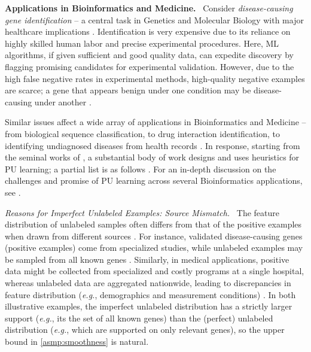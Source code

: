 \documentclass[11pt]{article}
\theoremstyle{plain}
\theoremstyle{definition}
\theoremstyle{remark}
\renewcommand{\paragraph}[1]{\medskip \noindent\textbf{#1}~}
\newcommand{\itparagraph}[1]{\medskip \noindent\textit{#1}~}
\newcommand{\eg}{\textit{e.g.}}
\begin{document}
    \paragraph{Applications in Bioinformatics and Medicine.} %
    Consider \textit{disease-causing gene identification} -- a central task in Genetics and Molecular Biology with major healthcare implications \cite{mordelet2011prodige,yang2012positive}.
    Identification is very expensive due to its reliance on highly skilled human labor and precise experimental procedures. 
    Here, ML algorithms, if given sufficient and good quality data, can expedite discovery by flagging promising candidates for experimental validation.
    However, due to the high false negative rates in experimental methods, high-quality negative examples are scarce; a gene that appears benign under one condition may be disease-causing under another \cite{reviewPUBioformatics2021}.

    Similar issues affect a wide array of applications in Bioinformatics and Medicine -- from biological sequence classification, to drug interaction identification, to identifying undiagnosed diseases from health records \cite{elkan2008pu}.
    In response, starting from the seminal works of \cite{hur2006proteinProtein,elkan2008pu}, a substantial body of work designs and uses heuristics for PU learning; a partial list is as follows \cite{ming2016pupylation,pengyi2019adaSampling,zhao2008geneFunction,xiao2008niologicalSequence,yang2012positive,luigi2010geneRegulatory}.
    For an in-depth discussion on the challenges and promise of PU learning across several Bioinformatics applications, see \citet{reviewPUBioformatics2021}.
    


    \itparagraph{Reasons for Imperfect Unlabeled Examples: Source Mismatch.}
        The feature distribution of unlabeled samples often differs from that of the positive examples when drawn from different sources \cite{jaskie2022positive}.
        For instance, validated disease-causing genes (positive examples) come from specialized studies, while unlabeled examples may be sampled from all known genes \cite{mordelet2011prodige,reviewPUBioformatics2021}.
        Similarly, in medical applications, positive data might be collected from specialized and costly programs at a single hospital, whereas unlabeled data are aggregated nationwide, leading to discrepancies in feature distribution (\eg{}, demographics and measurement conditions) \cite{Hassanzadeh2018ClinicalDC}. 
        In both illustrative examples, the imperfect unlabeled distribution has a strictly larger support (\eg{}, its the set of all known genes) than the (perfect) unlabeled distribution (\eg{}, which are supported on only relevant genes), so the upper bound in \cref{asmp:smoothness} is natural.
\end{document}
